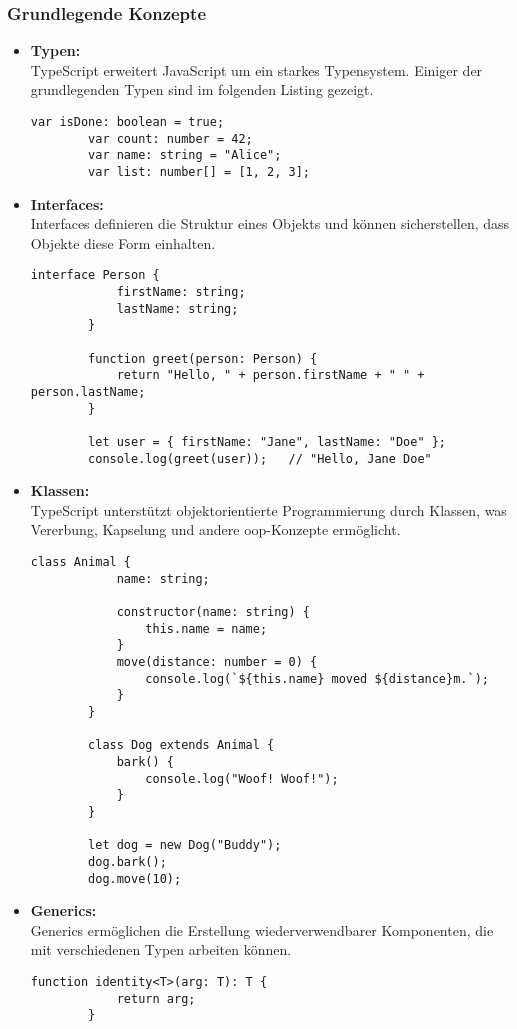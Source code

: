 \newpage

\subsubsection[Grundlegende Konzepte]{Grundlegende Konzepte}
\begin{itemize}
    \item \textbf{Typen:} \\
     TypeScript erweitert JavaScript um ein starkes Typensystem. Einiger der grundlegenden Typen sind im folgenden Listing gezeigt.
     \begin{lstlisting}[caption={Beispiel: Typen in TypeScript}]
        var isDone: boolean = true;
        var count: number = 42;
        var name: string = "Alice";
        var list: number[] = [1, 2, 3];
     \end{lstlisting}
    \item \textbf{Interfaces:} \\
    Interfaces definieren die Struktur eines Objekts und können sicherstellen, dass Objekte diese Form einhalten.
    \begin{lstlisting}[caption={Beispiel: Interfaces in TypeScript}]
        interface Person {
            firstName: string;
            lastName: string;
        }

        function greet(person: Person) {
            return "Hello, " + person.firstName + " " + person.lastName;
        }

        let user = { firstName: "Jane", lastName: "Doe" };
        console.log(greet(user));   // "Hello, Jane Doe"
    \end{lstlisting}
    \item \textbf{Klassen:} \\
    TypeScript unterstützt objektorientierte Programmierung durch Klassen, was Vererbung, Kapselung und andere \gls{oop}-Konzepte ermöglicht.
    \begin{lstlisting}[caption={Beispiel: Klassen in TypeScript}]
        class Animal {
            name: string;

            constructor(name: string) {
                this.name = name;
            }
            move(distance: number = 0) {
                console.log(`${this.name} moved ${distance}m.`);
            }
        }

        class Dog extends Animal {
            bark() {
                console.log("Woof! Woof!");
            }
        }

        let dog = new Dog("Buddy");
        dog.bark();
        dog.move(10);
    \end{lstlisting}
    \item \textbf{Generics:} \\
    Generics ermöglichen die Erstellung wiederverwendbarer Komponenten, die mit verschiedenen Typen arbeiten können.
    \begin{lstlisting}[caption={Beispiel: Generics in TypeScript}]
        function identity<T>(arg: T): T {
            return arg;
        }


\end{lstlisting}
\end{itemize}
